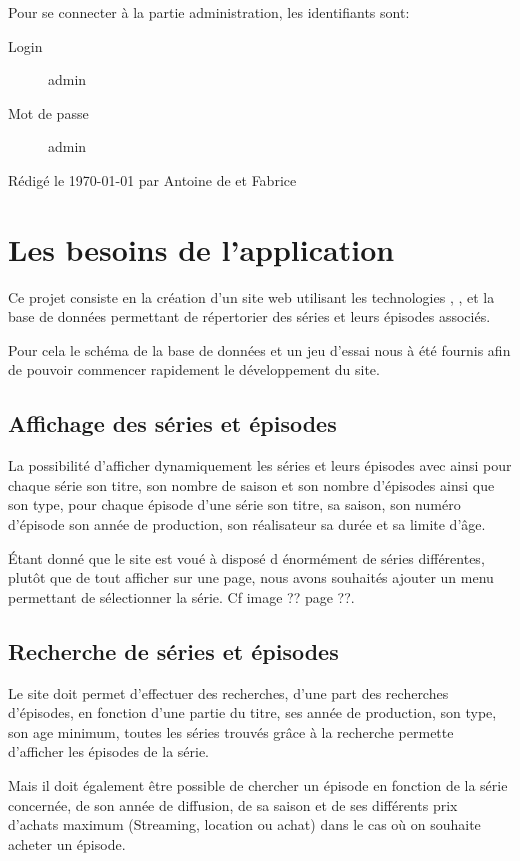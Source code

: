 \documentclass[12pt,a4paper,openany]{book}
\begin{document}
	Pour se connecter à la partie administration, les identifiants sont:
	\begin{description}
		\item[Login] admin
		\item[Mot de passe] admin
	\end{description}
	\vfill
	\footnotesize Rédigé le \today{} par Antoine de  et Fabrice 
	\tableofcontents
	\chapter{Les besoins de l'application}
	Ce projet consiste en la création d'un site web utilisant les technologies , ,  et la base de données  permettant
	de répertorier des séries et leurs épisodes associés.  

	Pour cela le schéma de la base de données et un jeu d'essai nous à été fournis afin de pouvoir commencer rapidement le développement du site.
	\section{Affichage des séries et épisodes}
	La possibilité d'afficher dynamiquement les séries et leurs épisodes avec ainsi pour chaque série son titre, son nombre de saison et son nombre
	d'épisodes ainsi que son type, pour chaque épisode d'une série  son titre, sa saison, son numéro d'épisode son année de production, son réalisateur sa
	durée  et sa limite d'âge.

	Étant donné que le site est voué à disposé d énormément de séries différentes, plutôt que de tout afficher sur une page, nous avons souhaités ajouter un
	menu permettant de sélectionner la série. Cf image ?? page ??. %
	\section{Recherche de séries et épisodes}
	Le site doit permet d'effectuer des recherches, d'une part des recherches d'épisodes, en fonction d'une partie du titre, ses année de production, son type,
	son age minimum, toutes les séries trouvés grâce à la recherche permette d'afficher les épisodes de la série.

	Mais il doit également être possible de chercher un épisode en fonction de la série concernée, de son année de diffusion, de sa saison et de ses différents
	prix d'achats maximum (Streaming, location ou achat) dans le cas où on souhaite acheter un épisode.
\end{document}
